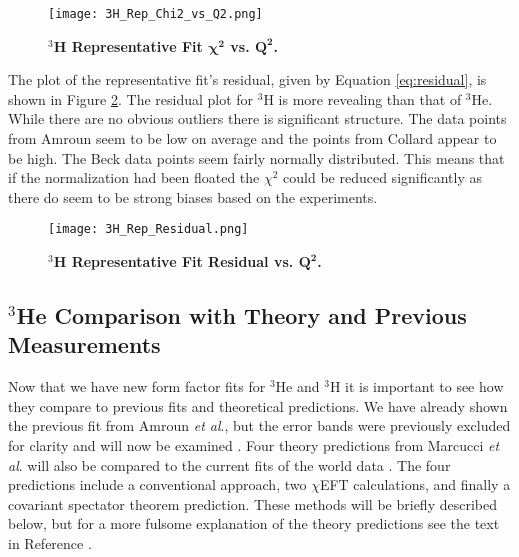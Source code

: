 \begin{figure}[!ht]
	\begin{center}
	\texttt{[image: 3H\_Rep\_Chi2\_vs\_Q2.png]}
	\end{center}
	\caption[$^3$H Representative Fit $\chi^2$ vs. $Q^2$]{
	{\bf{$^3$H Representative Fit $\boldsymbol{\chi^2}$ vs. $\boldsymbol{Q^2}$.}} }
	\label{fig:3h_rep_fit_chi2_q2}
\end{figure}

The plot of the representative fit's residual, given by Equation \ref{eq:residual}, is shown in Figure \ref{fig:3h_rep_fit_residual}. The residual plot for $^3$H is more revealing than that of $^3$He. While there are no obvious outliers there is significant structure. The data points from Amroun seem to be low on average and the points from Collard appear to be high. The Beck data points seem fairly normally distributed. This means that if the normalization had been floated the $\chi^2$ could be reduced significantly as there do seem to be strong biases based on the experiments. 

\begin{figure}[!ht]
	\begin{center}
	\texttt{[image: 3H\_Rep\_Residual.png]}
	\end{center}
	\caption[$^3$H Representative Fit Residual vs. $Q^2$]{
	{\bf{$^3$H Representative Fit Residual vs. $\boldsymbol{Q^2}$.}} }
	\label{fig:3h_rep_fit_residual}
\end{figure}

\subsection{$^3$He Comparison with Theory and Previous Measurements}
\label{ssec:3he_comparison_with_theory}

Now that we have new form factor fits for $^3$He and $^3$H it is important to see how they compare to previous fits and theoretical predictions. We have already shown the previous fit from Amroun \textit{et al}., but the error bands were previously excluded for clarity and will now be examined \cite{Article:Amroun}. Four theory predictions from Marcucci \textit{et al}. will also be compared to the current fits of the world data \cite{Article:Marcucci}. The four predictions include a conventional approach, two $\chi$EFT calculations, and finally a covariant spectator theorem prediction. These methods will be briefly described below, but for a more fulsome explanation of the theory predictions see the text in Reference \cite{Article:Marcucci}.

